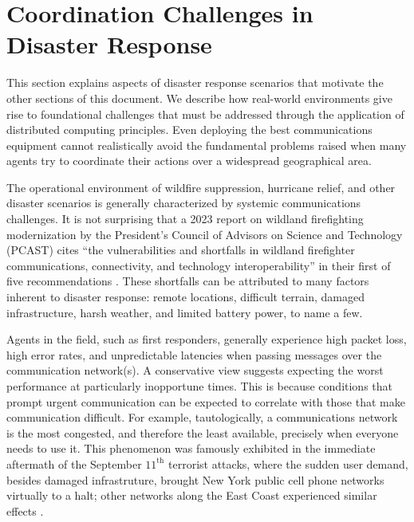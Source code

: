 \documentclass[]             %
{NASA}                       %
\theoremstyle{definition}
\begin{document}
\section{Coordination Challenges in Disaster Response}
\label{sec:disaster-response}

This section explains aspects of disaster response scenarios that
motivate the other sections of this document. We describe how
real-world environments give rise to foundational challenges that must
be addressed through the application of distributed computing
principles. Even deploying the best communications equipment cannot
realistically avoid the fundamental problems raised when many agents
try to coordinate their actions over a widespread geographical area.

The operational environment of wildfire suppression, hurricane relief,
and other disaster scenarios is generally characterized by systemic
communications challenges. It is not surprising that a 2023 report on
wildland firefighting modernization by the President’s Council of
Advisors on Science and Technology (PCAST) cites ``the vulnerabilities
and shortfalls in wildland firefighter communications, connectivity,
and technology interoperability'' in their first of five
recommendations \cite{pcast2023}. These shortfalls can be attributed
to many factors inherent to disaster response: remote locations,
difficult terrain, damaged infrastructure, harsh weather, and limited
battery power, to name a few.

Agents in the field, such as first responders, generally experience
high packet loss, high error rates, and unpredictable latencies when
passing messages over the communication network(s). A conservative
view suggests expecting the worst performance at particularly
inopportune times. This is because conditions that prompt urgent
communication can be expected to correlate with those that make
communication difficult. For example, tautologically, a communications
network is the most \mbox{congested}, and therefore the least
available, precisely when everyone needs to use it. This phenomenon
was famously exhibited in the immediate aftermath of the September
$11^\textrm{th}$ terrorist attacks, where the sudden user demand,
besides damaged infrastruture, brought New York public cell phone
networks virtually to a halt; other networks along the East Coast
experienced similar effects \cite{2011:Reardon}.
\end{document}
